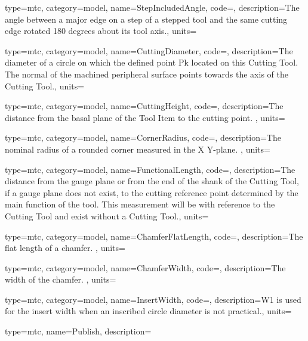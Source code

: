 {
  type=mtc,
  category=model,
  name={StepIncludedAngle},
  code=,
  description={The angle between a major edge on a step of a stepped tool and the same cutting edge rotated 180 degrees about its tool axis.},
  units=
}


{
  type=mtc,
  category=model,
  name={CuttingDiameter},
  code=,
  description={The diameter of a circle on which the defined point Pk located on this Cutting Tool. The normal of the machined peripheral surface points towards the axis of the Cutting Tool.},
  units=
}


{
  type=mtc,
  category=model,
  name={CuttingHeight},
  code=,
  description={The distance from the basal plane of the Tool Item to the cutting point. },
  units=
}


{
  type=mtc,
  category=model,
  name={CornerRadius},
  code=,
  description={The nominal radius of a rounded corner measured in the X Y-plane. },
  units=
}


{
  type=mtc,
  category=model,
  name={FunctionalLength},
  code=,
  description={The distance from the gauge plane or from the end of the shank of the Cutting Tool, if a gauge plane does not exist, to the cutting reference point determined by the main function of the tool. This measurement will be with reference to the Cutting Tool and \MUSTNOT exist without a Cutting Tool.},
  units=
}


{
  type=mtc,
  category=model,
  name={ChamferFlatLength},
  code=,
  description={The flat length of a chamfer. },
  units=
}


{
  type=mtc,
  category=model,
  name={ChamferWidth},
  code=,
  description={The width of the chamfer. },
  units=
}


{
  type=mtc,
  category=model,
  name={InsertWidth},
  code=,
  description={W1 is used for the insert width when an inscribed circle diameter is not practical.},
  units=
}


{
  type=mtc,
  name={Publish},
  description={}
}



